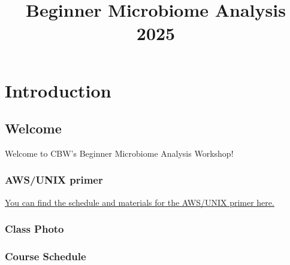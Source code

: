\documentclass[
]{book}
\title{Beginner Microbiome Analysis 2025}
\author{}
\date{\vspace{-2.5em}}
\begin{document}
\maketitle

{
\setcounter{tocdepth}{1}
\tableofcontents
}
\part{Introduction}\label{part-introduction}

\chapter{Welcome}\label{welcome}

Welcome to CBW's Beginner Microbiome Analysis Workshop!

\section{AWS/UNIX primer}\label{awsunix-primer}

\href{https://bioinformaticsdotca.github.io/AWS_2025}{You can find the schedule and materials for the AWS/UNIX primer here.}

\section{Class Photo}\label{class-photo}

\section{Course Schedule}\label{course-schedule}
\end{document}
